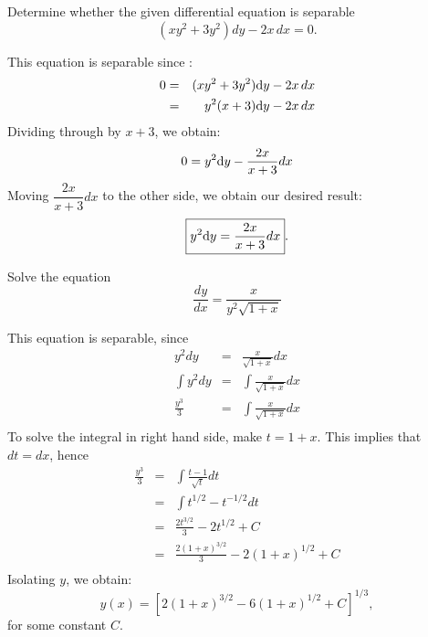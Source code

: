 \documentclass[11pt]{article}
\begin{document}
\begin{problem}
Determine whether the given differential equation is separable
\begin{equation}
     (xy^2 + 3y^2) dy - 2x \, dx =0.
\end{equation}
\end{problem}
\begin{solution}
This equation is separable since : 
\begin{eqnarray*}
0 & = & (xy^2 + 3y^2) {\rm d}y - 2x \, dx \\
&= & y^2(x + 3) {\rm d}y - 2x \, dx \\
\end{eqnarray*}
Dividing through by $x+3$, we obtain:
\begin{equation*}
 0  =  y^2 {\rm d}y -\dfrac{2x}{x+3} dx \\
\end{equation*}
Moving $\dfrac{2x}{x+3} dx$ to the other side, we obtain our desired result:
\begin{equation*}
 \boxed{y^2 {\rm d}y  =  \dfrac{2x}{x+3} dx }.
\end{equation*}
\end{solution}






\begin{problem}
Solve the equation
\begin{equation}
     \dfrac{ dy }{dx} = \frac{x}{y^2 \sqrt{1+x}}
\end{equation}
\end{problem}
\begin{solution}
This equation is separable, since
\begin{eqnarray*}
y^2dy & = & \frac{x}{ \sqrt{1+x}}dx \\
\int y^2dy & = & \int \frac{x}{ \sqrt{1+x}}dx \\
\frac{y^3}{3} & = & \int \frac{x}{ \sqrt{1+x}}dx \\
\end{eqnarray*}
To solve the integral in right hand side, make $t =1 +x$. This implies that ${d}t ={d}x$, hence
\begin{eqnarray*}
\frac{y^3}{3} & = & \int \frac{t-1}{ \sqrt{t}}dt \\
& = & \int t^{1/2} - t^{-1/2}dt\\
& = & \frac{2 t^{3/2}}{3} - 2 t^{1/2} +C\\
& = & \frac{2 (1+x)^{3/2}}{3} - 2 (1+x)^{1/2} +C\\
\end{eqnarray*}
Isolating $y$, we obtain:
\begin{equation*}
\boxed{y(x) = \left[ 2(1+x)^{3/2} - 6(1+x)^{1/2} +C\right]^{1/3}},
\end{equation*}
for some constant $C$.
\end{solution}
\end{document}

